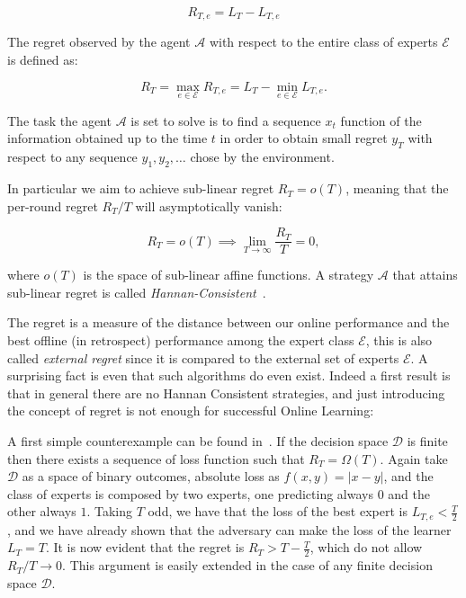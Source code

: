 \begin{equation}\label{def:Regret}
	R_{T,e} = L_T-L_{T,e}
\end{equation}

The regret observed by the agent $\mathcal A$ with respect to the entire class of experts $\mathcal E$ is defined as:

\begin{equation}
	R_T=\max\limits_{e\in\mathcal E}R_{T,e}=L_T-\min\limits_{e\in\mathcal E}L_{T,e}.
\end{equation}

The task the agent $\mathcal A$ is set to solve is to find a sequence $x_t$ function of the information obtained up to the time $t$ in order to obtain small regret $y_T$ with respect to any sequence $y_1,y_2,\ldots$ chose by the environment.

In particular we aim to achieve sub-linear regret $R_T= o(T)$, meaning that the per-round regret $R_T/T$ will asymptotically vanish: 

\begin{equation}
	R_T= o(T) \implies \lim\limits_{T\to \infty}\frac{R_T}{T}=0,
\end{equation}

where $ o(T)$ is the space of sub-linear affine functions. A strategy $\mathcal A$ that attains sub-linear regret is called \emph{Hannan-Consistent}~\cite{hannan1957approximation}.

The regret is a measure of the distance between our online performance and the best offline (in retrospect) performance among the expert class $\mathcal E$, this is also called \emph{external regret} since it is compared to the external set of experts $\mathcal E$. A surprising fact is even that such algorithms do even exist.
Indeed a first result is that in general there are no Hannan Consistent strategies, and just introducing the concept of regret is not enough for successful Online Learning: 

A first simple counterexample can be found in~\cite{cover1966behavior}. If the decision space $\mathcal D$ is finite then there exists a sequence of loss function such that $R_T=\Omega(T)$.
Again take $\mathcal D$ as a space of binary outcomes, absolute loss as $f(x,y)=|x - y|$, and the class of experts is composed by two experts, one predicting always $0$ and the other always $1$. Taking $T$ odd, we have that the loss of the best expert is $L_{T,e}<\frac{T}{2}$, and we have already shown that the adversary can make the loss of the learner $L_T=T$. It is now evident that the regret is $R_T>T-\frac{T}{2}$, which do not allow $R_T/T\to 0$. This argument is easily extended in the case of any finite decision space $\mathcal D$.

